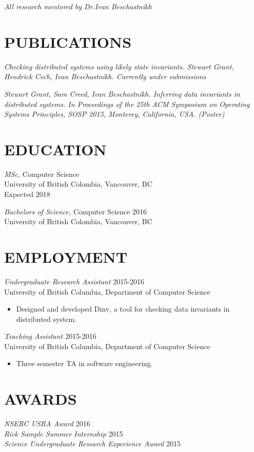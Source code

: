 \documentclass[line,margin]{res}
\begin{document}
\begin{resume}
{\sl \textit{All research mentored by Dr.Ivan Beschastnikh}}\\

\section{PUBLICATIONS}

{\sl 
    Checking distributed systems using likely state invariants. 
    Stewart Grant, Hendrick Cech, Ivan Beschastnikh. 
    \it{Currently under submissions}}

{\sl Stewart Grant, Sam Creed, Ivan Beschastnikh. Inferring data invariants in distributed systems. In \it{Proceedings of the 25th ACM Symposium on Operating Systems Principles, SOSP 2015}, Monterey, California, USA. (Poster)}

\section{EDUCATION}
{\sl MSc,} Computer Science\\
University of British Colombia, Vancouver, BC \\
Expected 2018

{\sl Bachelors of Science,} Computer Science	\hfill 2016\\
University of British Colombia, Vancouver, BC \\


\section{EMPLOYMENT} 
{\sl Undergraduate Research Assistant} \hfill 2015-2016\\
	University of British Columbia, Department of Computer Science
\begin{itemize} \itemsep -2pt
        \item Designed and developed Dinv, a tool for checking data invariants in distributed system.
    \end{itemize}
{\sl Teaching Assistant} \hfill 2015-2016\\
	University of British Columbia, Department of Computer Science
\begin{itemize} \itemsep -2pt
		\item Three semester TA in software engineering.
	\end{itemize}

\section{AWARDS}
{\sl NSERC USRA Award} \hfill 2016\\
{\sl Rick Sample Summer Internship} \hfill 2015\\
{\sl Science Undergraduate Research Experience Award} \hfill 2015\\



\end{resume}
\end{document}
